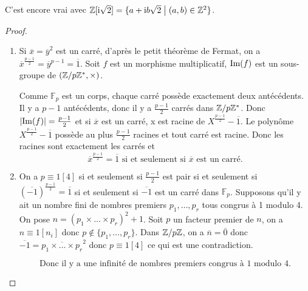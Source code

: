 \begin{remark}
	C'est encore vrai avec $\mathbb{Z}[\mathrm{i}\sqrt{2}]=\{a+\mathrm{i} b\sqrt{2}\bigm|(a,b)\in\mathbb{Z}^{2}\}$.
\end{remark}

\begin{proof}
	\phantom{}
	\begin{enumerate}
		\item Si $\overline{x}=\overline{y}^{2}$ est un carré, d'après le petit théorème de Fermat, on a $\overline{x}^{\frac{p-1}{2}}=\overline{y}^{p-1}=\overline{1}$. Soit 
		$f$ est un morphisme multiplicatif, $\mathrm{Im}(f)$ est un sous-groupe de $\left(\mathbb{Z}/p\mathbb{Z}^{*},\times\right)$.

		Comme $\mathbb{F}_{p}$ est un corps, chaque carré possède exactement deux antécédents. Il y a $p-1$ antécédents, donc il y a $\frac{p-1}{2}$ carrés dans $\mathbb{Z}/p\mathbb{Z}^{*}$. Donc $\vert\mathrm{Im}(f)\vert=\frac{p-1}{2}$ et si $\overline{x}$ est un carré, x est racine de $X^{\frac{p-1}{2}}-\overline{1}$. Le polynôme $X^{\frac{p-1}{2}}-\overline{1}$ possède au plus $\frac{p-1}{2}$ racines et tout carré est racine. Donc les racines sont exactement les carrés et 
		\begin{equation}
			\boxed{\overline{x}^{\frac{p-1}{2}}=\overline{1}\text{ si et seulement si }\overline{x}\text{ est un carré.}}
		\end{equation}

		\item On a $p\equiv1[4]$ si et seulement si $\frac{p-1}{2}$ est pair si  et seulement si $(\overline{-1})^{\frac{p-1}{2}}=\overline{1}$ si et seulement si $\overline{-1}$ est un carré dans $\mathbb{F}_{p}$.
		Supposons qu'il y ait un nombre fini de nombres premiers $p_{1},\dots,p_{r}$ tous congrus à 1 modulo 4. 
		On pose $n=(p_{1}\times\dots\times p_{r})^{2}+1$.
		Soit $p$ un facteur premier de $n$, on a $n\equiv 1[n_{i}]$ donc $p\notin\{p_{1},\dots,p_{r}\}$.
		Dans $\mathbb{Z}/p\mathbb{Z}$, on a $\overline{n}=\overline{0}$ donc $\overline{-1}=\overline{p_{1}\times\dots\times p_{r}}^{2}$ donc $p\equiv1[4]$ ce qui est une contradiction.

		\begin{equation}
			\boxed{\text{Donc il y a une infinité de nombres premiers congrus à 1 modulo 4.}}
		\end{equation}
	\end{enumerate}
\end{proof}

